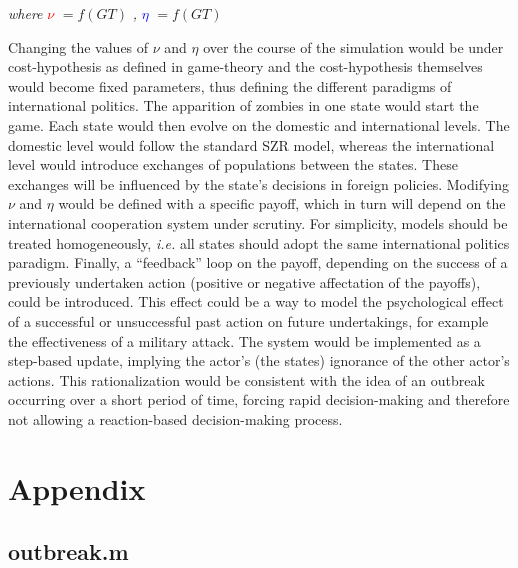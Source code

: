 \documentclass[11pt]{article} %
\begin{document}
\bigskip

\textit{where} \textcolor{red}{$\nu$} $= f(GT)$ \textit{,} \textcolor{blue}{$\eta$} $= f(GT)$  
\bigskip


Changing the values of $\nu$ and $\eta$ over the course of the simulation would be under cost-hypothesis as defined in game-theory and the cost-hypothesis themselves would become fixed parameters, thus defining the different paradigms of international politics. The apparition of zombies in one state would start the game. Each state would then evolve on the domestic and international levels. The domestic level would follow the standard SZR model, whereas the international level would introduce exchanges of populations between the states. These exchanges will be influenced by the state's decisions in foreign policies. Modifying $\nu$ and $\eta$ would be defined with a specific payoff, which in turn will depend on the international cooperation system under scrutiny. For simplicity, models should be treated homogeneously, \textit{i.e.} all states should adopt the same international politics paradigm. Finally, a ``feedback'' loop on the payoff, depending on the success of a previously undertaken action (positive or negative affectation of the payoffs), could be introduced. This effect could be a way to model the psychological effect of a successful or unsuccessful past action on future undertakings, for example the effectiveness of a military attack. The system would be implemented as a step-based update, implying the actor's (the states) ignorance of the other actor's actions. This rationalization would be consistent with the idea of an outbreak occurring over a short period of time, forcing rapid decision-making and therefore not allowing a reaction-based decision-making process. 





\newpage




\newpage

\section{Appendix}
\bigskip
\subsection{outbreak.m}
\label{sec:outbreak}

\bigskip
\bigskip
\bigskip
\end{document}
